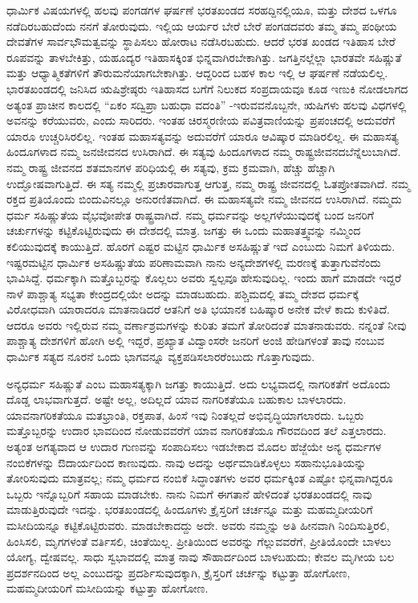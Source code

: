 ಧಾರ್ಮಿಕ ವಿಷಯಗಳಲ್ಲಿ ಹಲವು ಪಂಗಡಗಳ ಘರ್ಷಣೆ ಭರತಖಂಡದ ಸರಹದ್ದಿನಲ್ಲಿಯೂ, ಮತ್ತು ದೇಶದ ಒಳಗೂ ನಡೆದಿರಬಹುದೆಂದು ನನಗೆ ತೋರುವುದು. ಇಲ್ಲಿಯ ಆರ್ಯರ ಬೇರೆ ಬೇರೆ ಪಂಗಡದವರು ತಮ್ಮ ತಮ್ಮ ಪಂಥೀಯ ದೇವತೆಗಳ ಸಾರ್ವಭೌಮತ್ವವನ್ನು ಸ್ಥಾಪಿಸಲು ಹೋರಾಟ ನಡೆಸಿರಬಹುದು. ಆದರೆ ಭರತ ಖಂಡದ ಇತಿಹಾಸ ಬೇರೆ ರೂಪವನ್ನು ತಾಳಬೇಕಿತ್ತು, ಯಹೂದ್ಯರ ಇತಿಹಾಸಕ್ಕಿಂತ ಭಿನ್ನವಾಗಿರಬೇಕಾಗಿತ್ತು. ಜಗತ್ತಿನಲ್ಲೆಲ್ಲಾ ಭಾರತವೇ ಸಹಿಷ್ಣುತೆ ಮತ್ತು ಆಧ್ಯಾತ್ಮಿಕತೆಗಳಿಗೆ ತೌರುಮನೆಯಾಗಬೇಕಾಗಿತ್ತು. ಆದ್ದರಿಂದ ಬಹಳ ಕಾಲ ಇಲ್ಲಿ ಆ ಘರ್ಷಣೆ ನಡೆಯಲಿಲ್ಲ. ಭಾರತಖಂಡದಲ್ಲಿ ಜನಿಸಿದ ಋಷಿಶ್ರೇಷ್ಠರು ಇತಿಹಾಸದ ಬಗೆಗೆ ನಿಲುಕದ ಸಂಪ್ರದಾಯವೂ ಕೂಡ ಇಣುಕಿ ನೋಡಲಾಗದ ಅತ್ಯಂತ ಪ್ರಾಚೀನ ಕಾಲದಲ್ಲಿ “ಏಕಂ ಸದ್ವಿಪ್ರಾ ಬಹುಧಾ ವದಂತಿ” -ಇರುವವನೊಬ್ಬನೇ, ಋಷಿಗಳು ಹಲವು ವಿಧಗಳಲ್ಲಿ ಅವನನ್ನು ಕರೆಯುವರು, ಎಂದು ಸಾರಿದರು. ಇಂತಹ ಚಿರಸ್ಮರಣೀಯ ಪವಿತ್ರವಾಣಿಯನ್ನು ಪ್ರಪಂಚದಲ್ಲಿ ಅದುವರೆಗೆ ಯಾರೂ ಉಚ್ಚರಿಸಿರಲಿಲ್ಲ. ಇಂತಹ ಮಹಾಸತ್ಯವನ್ನು ಅದುವರೆಗೆ ಯಾರೂ ಆವಿಷ್ಕಾರ ಮಾಡಿರಲಿಲ್ಲ. ಈ ಮಹಾಸತ್ಯ ಹಿಂದೂಗಳಾದ ನಮ್ಮ ಜನಜೀವನದ ಉಸಿರಾಗಿದೆ. ಈ ಸತ್ಯವು ಹಿಂದೂಗಳಾದ ನಮ್ಮ ರಾಷ್ಟ್ರಜೀವನದ\break ಬೆನ್ನೆಲುಬಾಗಿದೆ. ನಮ್ಮ ರಾಷ್ಟ್ರ ಜೀವನದ ಶತಮಾನಗಳ ಪರಿಧಿಯಲ್ಲಿ ಈ ಸತ್ಯವು, ಕ್ರಮ ಕ್ರಮವಾಗಿ, ಹೆಚ್ಚು ಹೆಚ್ಚಾಗಿ ಉದ್ಘೋಷವಾಗುತ್ತಿದೆ. ಈ ಸತ್ಯ ನಮ್ಮಲ್ಲಿ ಪ್ರಚಾರವಾಗುತ್ತ ಆಗುತ್ತ, ನಮ್ಮ ರಾಷ್ಟ್ರ ಜೀವನದಲ್ಲಿ ಓತಪ್ರೋತವಾಗಿದೆ. ನಮ್ಮ ರಕ್ತದ ಪ್ರತಿಯೊಂದು ಬಿಂದುವಿನಲ್ಲೂ ಅನುರಣಿತವಾಗಿದೆ. ಈ ಮಹಾಸತ್ಯವೇ ನಮ್ಮ ಜೀವನದ ಉಸಿರಾಗಿದೆ. ನಮ್ಮದು ಧರ್ಮ ಸಹಿಷ್ಣುತೆಯ ವೈಭವೋಪೇತ ರಾಷ್ಟ್ರವಾಗಿದೆ. ನಮ್ಮ ಧರ್ಮವನ್ನು ಅಲ್ಲಗಳೆಯುವುದಕ್ಕೆ ಬಂದ ಜನರಿಗೆ ಚರ್ಚುಗಳನ್ನು ಕಟ್ಟಿಕೊಟ್ಟಿರುವುದು ಈ ದೇಶದಲ್ಲಿ ಮಾತ್ರ. ಜಗತ್ತು ಈ ಒಂದು ಮಹಾತತ್ತ್ವವನ್ನು ನಮ್ಮಿಂದ ಕಲಿಯುವುದಕ್ಕೆ ಕಾಯುತ್ತಿದೆ. ಹೊರಗೆ ಎಷ್ಟರ ಮಟ್ಟಿನ ಧಾರ್ಮಿಕ ಅಸಹಿಷ್ಣುತೆ ಇದೆ ಎಂಬುದು ನಿಮಗೆ ತಿಳಿಯದು. ಇಷ್ಟರಮಟ್ಟಿನ ಧಾರ್ಮಿಕ ಅಸಹಿಷ್ಣುತೆಯ ಪರಿಣಾಮವಾಗಿ ನಾನು ಅನ್ಯದೇಶಗಳಲ್ಲಿ ಮರಣಕ್ಕೆ ತುತ್ತಾಗುವೆನೆಂದು ಭಾವಿಸಿದ್ದೆ. ಧರ್ಮಕ್ಕಾಗಿ ಮತ್ತೊಬ್ಬರನ್ನು ಕೊಲ್ಲಲು ಅವರು ಸ್ವಲ್ಪವೂ ಹೇಸುವುದಿಲ್ಲ. ಇಂದು ಹಾಗೆ ಮಾಡದೇ ಇದ್ದರೆ ನಾಳೆ ಪಾಶ್ಚಾತ್ಯ ಸಭ್ಯತಾ ಕೇಂದ್ರದಲ್ಲಿಯೇ ಅದನ್ನು ಮಾಡಬಹುದು. ಪಶ್ಚಿಮದಲ್ಲಿ ತಮ್ಮ ದೇಶದ ಧರ್ಮಕ್ಕೆ ವಿರೋಧವಾಗಿ ಯಾರಾದರೂ ಮಾತನಾಡಿದರೆ ಆತನಿಗೆ ಅತಿ ಭಯಾನಕ ಬಹಿಷ್ಕಾರ ಅನೇಕ ವೇಳೆ ಕಾದು ಕುಳಿತಿದೆ. ಆದರೂ ಅವರು ಇಲ್ಲಿರುವ ನಮ್ಮ ವರ್ಣಾಶ್ರಮಗಳನ್ನು ಕುರಿತು ತಮಗೆ ತೋರಿದಂತೆ ಮಾತನಾಡುವರು. ನನ್ನಂತೆ ನೀವು ಪಾಶ್ಚಾತ್ಯ ದೇಶಗಳಿಗೆ ಹೋಗಿ ಅಲ್ಲಿ ಇದ್ದರೆ, ಪ್ರಖ್ಯಾತ ವಿದ್ವಾಂಸರೇ ಜನರಿಗೆ ಅಂಜಿ ಹೇಡಿಗಳಂತೆ ತಾವು ನಂಬುವ ಧಾರ್ಮಿಕ ಸತ್ಯದ ನೂರನೆ ಒಂದು ಭಾಗವನ್ನೂ ವ್ಯಕ್ತಪಡಿಸಲಾರರೆಂಬುದು ಗೊತ್ತಾಗುವುದು.

ಅನ್ಯಧರ್ಮ ಸಹಿಷ್ಣುತೆ ಎಂಬ ಮಹಾಸತ್ಯಕ್ಕಾಗಿ ಜಗತ್ತು ಕಾಯುತ್ತಿದೆ. ಅದು ಲಭ್ಯವಾದಲ್ಲಿ ನಾಗರಿಕತೆಗೆ ಅದೊಂದು ದೊಡ್ಡ ಲಾಭವಾಗುತ್ತದೆ. ಅಷ್ಟೇ ಅಲ್ಲ, ಅದಿಲ್ಲದೆ ಯಾವ ನಾಗರಿಕತೆಯೂ ಬಹುಕಾಲ ಬಾಳಲಾರದು. ಯಾವ\break ನಾಗರಿ\-ಕತೆಯೂ ಮತಭ್ರಾಂತಿ, ರಕ್ತಪಾತ, ಹಿಂಸೆ ಇವು ನಿಂತಲ್ಲದೆ ಅಭಿವೃದ್ಧಿಯಾಗಲಾರದು. ಒಬ್ಬರು ಮತ್ತೊಬ್ಬರನ್ನು ಉದಾರ ಭಾವದಿಂದ ನೋಡುವವರೆಗೆ ಯಾವ ನಾಗರಿಕತೆಯೂ ಗೌರವದಿಂದ ತಲೆ ಎತ್ತಲಾರದು. ಅತ್ಯಂತ ಅಗತ್ಯವಾದ ಆ ಉದಾರ ಗುಣವನ್ನು ಸಂಪಾದಿಸಲು ಇಡಬೇಕಾದ ಮೊದಲ ಹೆಜ್ಜೆಯೇ ಅನ್ಯ ಧರ್ಮಗಳ ನಂಬಿಕೆಗಳನ್ನು ಔದಾರ್ಯದಿಂದ ಕಾಣುವುದು. ನಾವು ಅದನ್ನು ಅರ್ಥಮಾಡಿಕೊಳ್ಳಲು ಸಹಾನುಭೂತಿಯನ್ನು ತೋರಿಸುವುದು ಮಾತ್ರವಲ್ಲ; ನಮ್ಮ ಧರ್ಮದ ನಂಬಿಕೆ ಸಿದ್ಧಾಂತಗಳು ಅವರ ಧರ್ಮಕ್ಕಿಂತ ಎಷ್ಟೋ ಭಿನ್ನವಾಗಿದ್ದರೂ ಒಬ್ಬರು ಇನ್ನೊಬ್ಬರಿಗೆ ಸಹಾಯ ಮಾಡಬೇಕು. ನಾನು ನಿಮಗೆ ಈಗತಾನೆ ಹೇಳಿದಂತೆ ಭರತಖಂಡದಲ್ಲಿ ನಾವು ಮಾಡುತ್ತಿರುವುದೇ ಇದನ್ನು. ಭರತಖಂಡದಲ್ಲಿ ಹಿಂದೂಗಳು ಕ್ರೈಸ್ತರಿಗೆ ಚರ್ಚನ್ನೂ ಮತ್ತು ಮಹಮ್ಮದೀಯರಿಗೆ ಮಸೀದಿಯನ್ನೂ ಕಟ್ಟಿಕೊಟ್ಟಿರುವರು. ಮಾಡಬೇಕಾದದ್ದು ಅದೇ. ಅವರು ನಮ್ಮನ್ನು ಅತಿ ಹೀನವಾಗಿ ನಿಂದಿಸುತ್ತಿರಲಿ, ಹಿಂಸಿಸಲಿ, ಮೃಗಗಳಂತೆ ವರ್ತಿಸಲಿ, ಚಿಂತೆಯಿಲ್ಲ. ಪ್ರೀತಿಯಿಂದ ಅವರನ್ನು ಗೆಲ್ಲುವವರೆಗೆ, ಪ್ರೀತಿಯೊಂದೇ ಬಾಳಲು ಯೋಗ್ಯ, ದ್ವೇಷವಲ್ಲ. ಸಾಧು ಸ್ವಭಾವದಲ್ಲಿ ಮಾತ್ರ ನಾವು ಸೌಹಾರ್ದದಿಂದ ಬಾಳಬಹುದು; ಕೇವಲ ಮೃಗೀಯ ಬಲ ಪ್ರದರ್ಶನದಿಂದ ಅಲ್ಲ ಎಂಬುದನ್ನು ಪ್ರದರ್ಶಿಸುವುದಕ್ಕಾಗಿ, ಕ್ರೈಸ್ತರಿಗೆ ಚರ್ಚನ್ನು ಕಟ್ಟುತ್ತಾ ಹೋಗೋಣ, ಮಹಮ್ಮದೀಯರಿಗೆ ಮಸೀದಿಯನ್ನು ಕಟ್ಟುತ್ತಾ ಹೋಗೋಣ.

